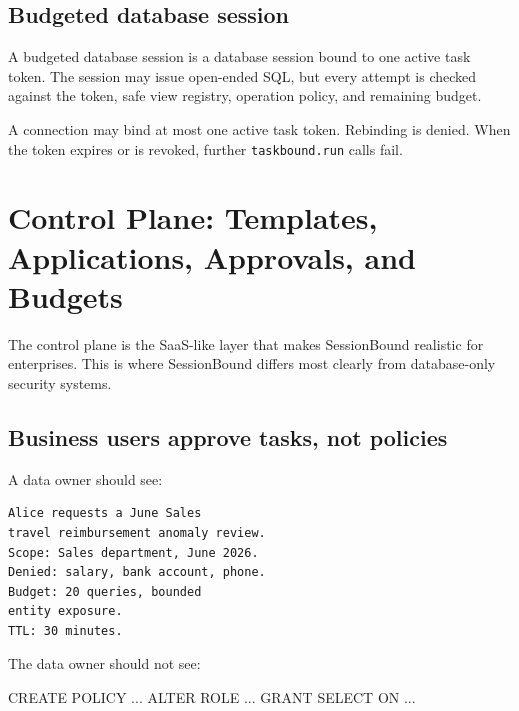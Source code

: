 \documentclass[journal]{IEEEtran}
\newenvironment{Shaded}{}{}
\newcommand{\KeywordTok}[1]{\textcolor[rgb]{0.00,0.44,0.13}{#1}}
\newcommand{\NormalTok}[1]{#1}
\newcommand{\OperatorTok}[1]{\textcolor[rgb]{0.40,0.40,0.40}{#1}}
\begin{document}
\hypertarget{budgeted-database-session}{%
\subsection{Budgeted database
session}\label{budgeted-database-session}}

A budgeted database session is a database session bound to one active
task token. The session may issue open-ended SQL, but every attempt is
checked against the token, safe view registry, operation policy, and
remaining budget.

A connection may bind at most one active task token. Rebinding is
denied. When the token expires or is revoked, further
\texttt{taskbound.run} calls fail.


\hypertarget{control-plane-templates-applications-approvals-and-budgets}{%
\section{Control Plane: Templates, Applications, Approvals, and
Budgets}\label{control-plane-templates-applications-approvals-and-budgets}}

The control plane is the SaaS-like layer that makes SessionBound
realistic for enterprises. This is where SessionBound differs most
clearly from database-only security systems.

\hypertarget{business-users-approve-tasks-not-policies}{%
\subsection{Business users approve tasks, not
policies}\label{business-users-approve-tasks-not-policies}}

A data owner should see:

\begin{verbatim}
Alice requests a June Sales
travel reimbursement anomaly review.
Scope: Sales department, June 2026.
Denied: salary, bank account, phone.
Budget: 20 queries, bounded
entity exposure.
TTL: 30 minutes.
\end{verbatim}

The data owner should not see:

\begin{Shaded}
\begin{Highlighting}[]
\KeywordTok{CREATE}\NormalTok{ POLICY }\OperatorTok{..}\NormalTok{.}
\KeywordTok{ALTER} \KeywordTok{ROLE} \OperatorTok{..}\NormalTok{.}
\KeywordTok{GRANT} \KeywordTok{SELECT} \KeywordTok{ON} \OperatorTok{..}\NormalTok{.}
\end{Highlighting}
\end{Shaded}
\end{document}
